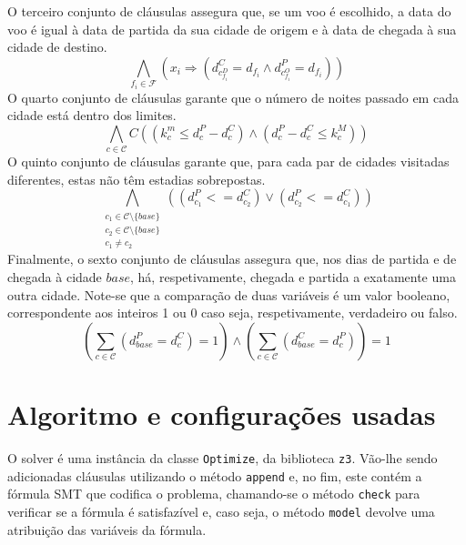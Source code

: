 \documentclass[12pt,a4paper]{article}
\begin{document}
        O terceiro conjunto de cláusulas assegura que, se um voo é escolhido, a data do voo é igual à data de partida da sua cidade de origem e à data de chegada à sua cidade de destino.
        \begin{equation}
            \bigwedge_{f_i \in \mathcal{F}}
            \left(
            x_i \Rightarrow
            \left( d_{c_{f_i}^D}^C = d_{f_i} \land d_{c_{f_i}^O}^P = d_{f_i} \right)
            \right)
            \label{flight_date}
        \end{equation}
        O quarto conjunto de cláusulas garante que o número de noites passado em cada cidade está dentro dos limites.
        \begin{equation}
            \bigwedge_{c \in \mathcal{C}}C
            \left(
            \left( k_c^m \leq d_c^P - d_c^C \right)
            \land
            \left( d_c^P - d_c^C \leq k_c^M \right)
            \right)
        \end{equation}
        O quinto conjunto de cláusulas garante que, para cada par de cidades visitadas diferentes, estas não têm estadias sobrepostas.
        \begin{equation}
            \bigwedge_{\substack{c_1 \in \mathcal{C} \setminus \{base\} \\
                                 c_2 \in \mathcal{C} \setminus \{base\} \\
                                 c_1 \neq c_2}}
            \left(
            \left( d_{c_1}^P <= d_{c_2}^C \right)
            \lor
            \left( d_{c_2}^P <= d_{c_1}^C \right)
            \right)
        \end{equation}
        Finalmente, o sexto conjunto de cláusulas assegura que, nos dias de partida e de chegada à cidade $base$, há, respetivamente, chegada e partida a exatamente uma outra cidade. Note-se que a comparação de duas variáveis é um valor booleano, correspondente aos inteiros 1 ou 0 caso seja, respetivamente, verdadeiro ou falso.
        \begin{equation}
            \left(
            \sum_{c \in \mathcal{C}}
            \left(
            d_{base}^P = d_c^C
            \right)
            = 1
            \right)
            \land
            \left(
            \sum_{c \in \mathcal{C}}
            \left(
            d_{base}^C = d_c^P
            \right)
            \right)
            = 1
        \end{equation}
        
    \section{Algoritmo e configurações usadas}
        O solver é uma instância da classe \texttt{Optimize}, da biblioteca \texttt{z3}. Vão-lhe sendo adicionadas cláusulas utilizando o método \texttt{append} e, no fim, este contém a fórmula SMT que codifica o problema, chamando-se o método \texttt{check} para verificar se a fórmula é satisfazível e, caso seja, o método \texttt{model} devolve uma atribuição das variáveis da fórmula.
\end{document}
